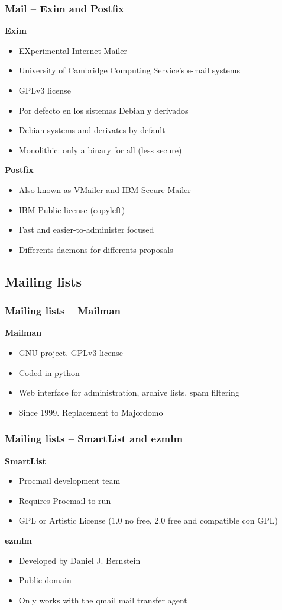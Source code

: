 \documentclass{beamer}
\begin{document}
  \begin{frame}
    \frametitle{Mail -- Exim and Postfix}
    \textbf{Exim}
    \begin{itemize}
      \item EXperimental Internet Mailer
      \item University of Cambridge Computing Service's e-mail systems
      \item GPLv3 license
      \item Por defecto en los sistemas Debian y derivados
      \item Debian systems and derivates by default
      \item Monolithic: only a binary for all (less secure)
    \end{itemize}
    \textbf{Postfix}
    \begin{itemize}
      \item Also known as VMailer and IBM Secure Mailer
      \item IBM Public license (copyleft)
      \item Fast and easier-to-administer focused
      \item Differents daemons for differents proposals
    \end{itemize}
  \end{frame}
  
  \subsection{Mailing lists}
  \begin{frame}
    \frametitle{Mailing lists -- Mailman}
    \textbf{Mailman}
    \begin{itemize}
      \item GNU project. GPLv3 license
      \item Coded in python
      \item Web interface for administration, archive lists, spam filtering
      \item Since 1999. Replacement to Majordomo
    \end{itemize}
  \end{frame}
  
  \begin{frame}
    \frametitle{Mailing lists -- SmartList and ezmlm}
    \textbf{SmartList}
    \begin{itemize}
      \item Procmail development team
      \item Requires Procmail to run
      \item GPL or Artistic License (1.0 no free, 2.0 free and compatible con GPL)
    \end{itemize}
    \textbf{ezmlm}
    \begin{itemize}
      \item Developed by Daniel J. Bernstein
      \item Public domain
      \item Only works with the qmail mail transfer agent
    \end{itemize}
  \end{frame}
  
\end{document}
